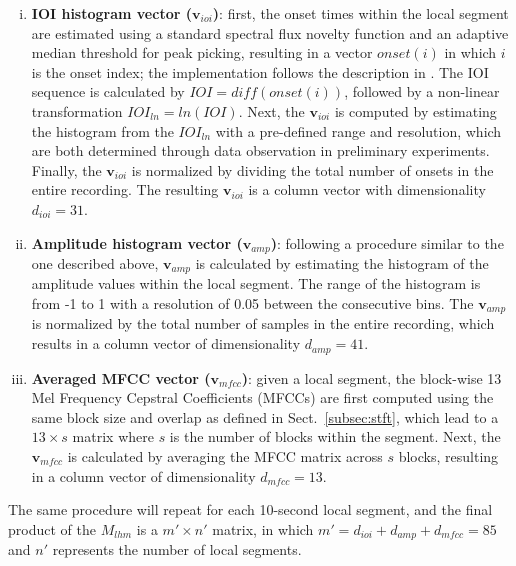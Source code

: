 \documentclass{article}
\begin{document}
\begin{enumerate}[(i)]
    \item   \textbf{IOI histogram vector ($\mathbf{v}_{ioi}$)}: first, the onset times within the local segment are estimated using a standard spectral flux novelty function and an adaptive median threshold for peak picking, resulting in a vector $onset(i)$ in which $i$ is the onset index; the implementation follows the description in \cite{Lerch2012}. The IOI sequence is calculated by $IOI = diff(onset(i))$, followed by a non-linear transformation $IOI_{ln} = ln(IOI)$. Next, the $\mathbf{v}_{ioi}$ is computed by estimating the histogram from the $IOI_{ln}$ with a pre-defined range and resolution, which are both determined through data observation in preliminary experiments. Finally, the $\mathbf{v}_{ioi}$ is normalized by dividing the total number of onsets in the entire recording. The resulting $\mathbf{v}_{ioi}$ is a column vector with dimensionality $d_{ioi} = 31$.

    \item   \textbf{Amplitude histogram vector ($\mathbf{v}_{amp}$)}: following a procedure similar to the one described above, $\mathbf{v}_{amp}$ is calculated by estimating the histogram of the amplitude values within the local segment. The range of the histogram is from -1 to 1 with a resolution of 0.05 between the consecutive bins. The $\mathbf{v}_{amp}$ is normalized by the total number of samples in the entire recording, which results in a column vector of dimensionality $d_{amp} = 41$.  

    \item   \textbf{Averaged MFCC vector ($\mathbf{v}_{mfcc}$)}: given a local segment, the block-wise 13 Mel Frequency Cepstral Coefficients (MFCCs) are first computed using the same block size and overlap as defined in Sect.~\ref{subsec:stft}, which lead to a $13 \times s$ matrix where $s$ is the number of blocks within the segment. Next, the $\mathbf{v}_{mfcc}$ is calculated by averaging the MFCC matrix across $s$ blocks, resulting in a column vector of dimensionality $d_{mfcc} = 13$. 
\end{enumerate} 

The same procedure will repeat for each 10-second local segment, and the final product of the $M_{lhm}$ is a $m' \times n'$ matrix,  in which $m' = d_{ioi} + d_{amp} + d_{mfcc} = 85$ and $n'$ represents the number of local segments.
\end{document}

